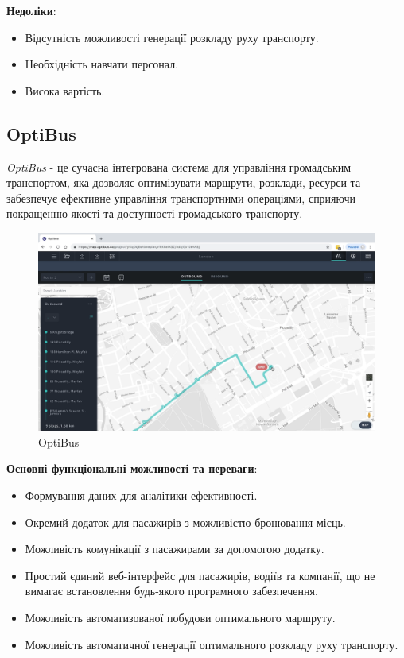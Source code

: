 \documentclass[14pt]{extreport}
\begin{document}
\begin{normalsize}
	\textbf{Недоліки}:
	\begin{itemize}
		\item Відсутність можливості генерації розкладу руху транспорту.
		\item Необхідність навчати персонал.
		\item Висока вартість.
	\end{itemize}
	
	\subsection*{OptiBus}
	\textit{OptiBus} - це сучасна інтегрована система для управління громадським транспортом, яка дозволяє оптимізувати маршрути, розклади, ресурси та забезпечує ефективне управління транспортними операціями, сприяючи покращенню якості та доступності громадського транспорту.
	
	
	\begin{figure}[H]
		\centering
		\includegraphics[scale=0.25]{3}
		\caption{OptiBus}
	\end{figure}
	
	\textbf{Основні функціональні можливості та переваги}:
	\begin{itemize}
		\item Формування даних для аналітики ефективності.
		\item Окремий додаток для пасажирів з можливістю бронювання місць.
		\item Можливість комунікації з пасажирами за допомогою додатку.
		\item Простий єдиний веб-інтерфейс для пасажирів, водіїв та компанії, що не вимагає встановлення будь-якого програмного забезпечення.
		\item Можливість автоматизованої побудови оптимального маршруту.
		\item Можливість автоматичної генерації оптимального розкладу руху транспорту.
	\end{itemize}
	

\end{normalsize}
\end{document}
